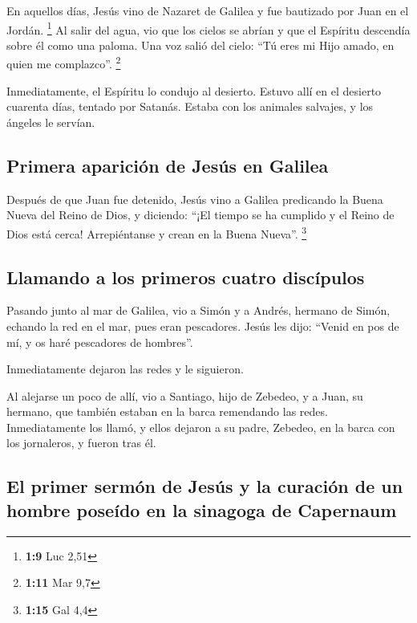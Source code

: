 \begin{paracol}{2}
 En aquellos días, Jesús vino de Nazaret de Galilea y fue
bautizado por Juan en el Jordán. \footnote{\textbf{1:9} Luc 2,51}
 Al salir del agua, vio que los cielos se abrían y que el
Espíritu descendía sobre él como una paloma.  Una voz
salió del cielo: ``Tú eres mi Hijo amado, en quien me complazco''.
\footnote{\textbf{1:11} Mar 9,7}

 Inmediatamente, el Espíritu lo condujo al desierto.
 Estuvo allí en el desierto cuarenta días, tentado por
Satanás. Estaba con los animales salvajes, y los ángeles le servían.

\hypertarget{primera-apariciuxf3n-de-jesuxfas-en-galilea}{%
\subsection{Primera aparición de Jesús en
Galilea}\label{primera-apariciuxf3n-de-jesuxfas-en-galilea}}

 Después de que Juan fue detenido, Jesús vino a Galilea
predicando la Buena Nueva del Reino de Dios,  y diciendo:
``¡El tiempo se ha cumplido y el Reino de Dios está cerca! Arrepiéntanse
y crean en la Buena Nueva''. \footnote{\textbf{1:15} Gal 4,4}

\hypertarget{llamando-a-los-primeros-cuatro-discuxedpulos}{%
\subsection{Llamando a los primeros cuatro
discípulos}\label{llamando-a-los-primeros-cuatro-discuxedpulos}}

 Pasando junto al mar de Galilea, vio a Simón y a Andrés,
hermano de Simón, echando la red en el mar, pues eran pescadores.
 Jesús les dijo: ``Venid en pos de mí, y os haré
pescadores de hombres''.

 Inmediatamente dejaron las redes y le siguieron.

 Al alejarse un poco de allí, vio a Santiago, hijo de
Zebedeo, y a Juan, su hermano, que también estaban en la barca
remendando las redes.  Inmediatamente los llamó, y ellos
dejaron a su padre, Zebedeo, en la barca con los jornaleros, y fueron
tras él.

\hypertarget{el-primer-sermuxf3n-de-jesuxfas-y-la-curaciuxf3n-de-un-hombre-poseuxeddo-en-la-sinagoga-de-capernaum}{%
\subsection{El primer sermón de Jesús y la curación de un hombre poseído
en la sinagoga de
Capernaum}\label{el-primer-sermuxf3n-de-jesuxfas-y-la-curaciuxf3n-de-un-hombre-poseuxeddo-en-la-sinagoga-de-capernaum}}


\end{paracol}
